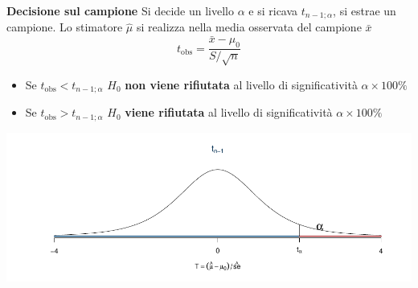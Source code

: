 \documentclass[
  11pt,
]{book}
\providecommand{\tightlist}{%
  \setlength{\itemsep}{0pt}\setlength{\parskip}{0pt}}
\theoremstyle{mytheoremstyle}
\theoremstyle{mydefstyle}
\begin{document}
\begin{info}

\textbf{Decisione sul campione} Si decide un livello \(\alpha\) e si ricava
\(t_{n-1;\alpha}\), si estrae un campione. Lo stimatore \(\hat\mu\) si
realizza nella media osservata del campione \(\bar x\)
\[t_{\text{obs}}=\frac{\bar x -\mu_0}{S/\sqrt n}\]

\begin{itemize}
\tightlist
\item
  Se \(t_{\text{obs}}<t_{n-1;\alpha}\) \(H_0\) \textbf{non viene rifiutata} al
  livello di significatività \(\alpha\times100\%\)
\item
  Se \(t_{\text{obs}}>t_{n-1;\alpha}\) \(H_0\) \textbf{viene rifiutata} al
  livello di significatività \(\alpha\times100\%\)
\end{itemize}

\begin{center}\includegraphics{Appunti_di_Statistica_2025_files/figure-latex/15-test-mu-pi-22-1} \end{center}

\end{info}
\end{document}
